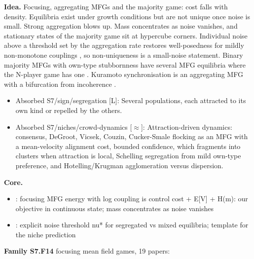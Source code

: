 \documentclass[10pt]{article}
\newcommand{\memb}[1]{\par\smallskip\textbf{#1}\quad}
\begin{document}
\textbf{Idea.} Focusing, aggregating MFGs and the majority game: cost falls with density. Equilibria exist under growth conditions but are not unique once noise is small. Strong aggregation blows up. Mass concentrates as noise vanishes, and stationary states of the majority game sit at hypercube corners. Individual noise above a threshold set by the aggregation rate restores well-posedness for mildly non-monotone couplings \citep{Cirant-long21}, so non-uniqueness is a small-noise statement. Binary majority MFGs with own-type stubbornness have several MFG equilibria where the N-player game has one \citep{DaiPra-polarization21}. Kuramoto synchronisation is an aggregating MFG with a bifurcation from incoherence \citep{Yin-synchronization12}.
\begin{itemize}[nosep,leftmargin=1.2em]
\item Absorbed S7/sign/segregation [L]: Several populations, each attracted to its own kind or repelled by the others.
\item Absorbed S7/niches/crowd-dynamics [\ensuremath{\approx}]: Attraction-driven dynamics: consensus, DeGroot, Vicsek, Couzin, Cucker-Smale flocking as an MFG with a mean-velocity alignment cost, bounded confidence, which fragments into clusters when attraction is local, Schelling segregation from mild own-type preference, and Hotelling/Krugman agglomeration versus dispersion.
\end{itemize}


\memb{Core.}
\begin{itemize}[nosep,leftmargin=1.2em]
\item \citet{Cesaroni-concentration19}: focusing MFG energy with log coupling is control cost + E[V] + H(m): our objective in continuous state; mass concentrates as noise vanishes
\item \citet{Cirant-bifurcation17}: explicit noise threshold nu* for segregated vs mixed equilibria; template for the niche prediction
\end{itemize}
\memb{Family S7.F14} focusing mean field games, 19 papers: {\footnotesize \citetext{\citealp{Cesaroni-concentration19}; \citealp{Cirant-stationary16}; \citealp{Cecchin-convergence19}; \citealp{Mou-mean22}; \citealp{Gomes-one16}\dag; \citealp{Swiecicki-schrodinger16}; \citealp{Cirant-existence17}; \citealp{Cesaroni-ground18}; \citealp{Cirant-time18}; \citealp{Bardi-non19}; \citealp{Cesaroni-introduction19}\dag; \citealp{Ullmo-quadratic19}; \citealp{Bardi-convergence20}; \citealp{Cirant-ghilli20}; \citealp{Cirant-long21}; \citealp{Bernardini-ergodic22}; \citealp{Bernardini-mass22}; \citealp{Mou-mean22b}; \citealp{Bansil-hidden24}}}
\end{document}
